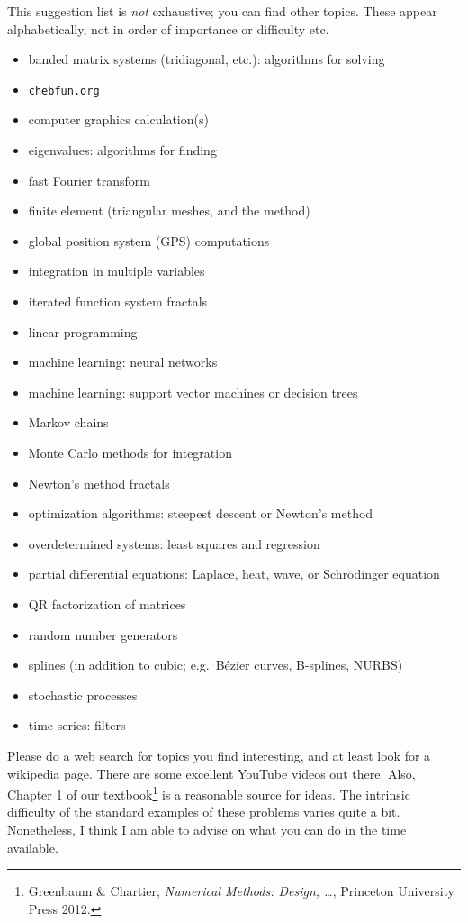 \documentclass[11pt]{amsart}
\begin{document}
This suggestion list is \emph{not} exhaustive; you can find other topics.  These appear alphabetically, not in order of importance or difficulty etc.
\begin{itemize}
\item banded matrix systems (tridiagonal, etc.): algorithms for solving
\item \texttt{chebfun.org}
\item computer graphics calculation(s)
\item eigenvalues: algorithms for finding
\item fast Fourier transform
\item finite element (triangular meshes, and the method)
\item global position system (GPS) computations
\item integration in multiple variables
\item iterated function system fractals
\item linear programming
\item machine learning: neural networks
\item machine learning: support vector machines or decision trees
\item Markov chains
\item Monte Carlo methods for integration
\item Newton's method fractals
\item optimization algorithms: steepest descent or Newton's method
\item overdetermined systems: least squares and regression
\item partial differential equations: Laplace, heat, wave, or Schr\"odinger equation
\item QR factorization of matrices
\item random number generators
\item splines (in addition to cubic; e.g.~B\'ezier curves, B-splines, NURBS)
\item stochastic processes
\item time series: filters
\end{itemize}

\medskip \noindent Please do a web search for topics you find interesting, and at least look for a wikipedia page.  There are some excellent YouTube videos out there.  Also, Chapter 1 of our textbook\footnote{Greenbaum \& Chartier, \emph{Numerical Methods: Design, \dots}, Princeton University Press 2012.} is a reasonable source for ideas.  The intrinsic difficulty of the standard examples of these problems varies quite a bit. Nonetheless, I think I am able to advise on what you can do in the time available.
\end{document}
